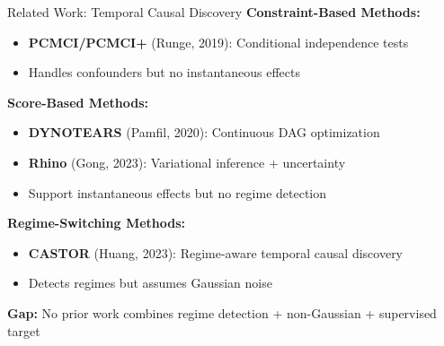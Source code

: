 \documentclass[aspectratio=169]{beamer}
\begin{document}
\begin{frame}{Related Work: Temporal Causal Discovery}
\textbf{Constraint-Based Methods:}
\begin{itemize}
    \item \textbf{PCMCI/PCMCI+} (Runge, 2019): Conditional independence tests
    \item Handles confounders but \textcolor{warnred}{no instantaneous effects}
\end{itemize}

\vspace{0.2cm}
\textbf{Score-Based Methods:}
\begin{itemize}
    \item \textbf{DYNOTEARS} (Pamfil, 2020): Continuous DAG optimization
    \item \textbf{Rhino} (Gong, 2023): Variational inference + uncertainty
    \item Support instantaneous effects but \textcolor{warnred}{no regime detection}
\end{itemize}

\vspace{0.2cm}
\textbf{Regime-Switching Methods:}
\begin{itemize}
    \item \textbf{CASTOR} (Huang, 2023): Regime-aware temporal causal discovery
    \item Detects regimes but \textcolor{warnred}{assumes Gaussian noise}
\end{itemize}

\vspace{0.2cm}
\textbf{Gap:} No prior work combines regime detection + non-Gaussian + supervised target
\end{frame}
\end{document}
